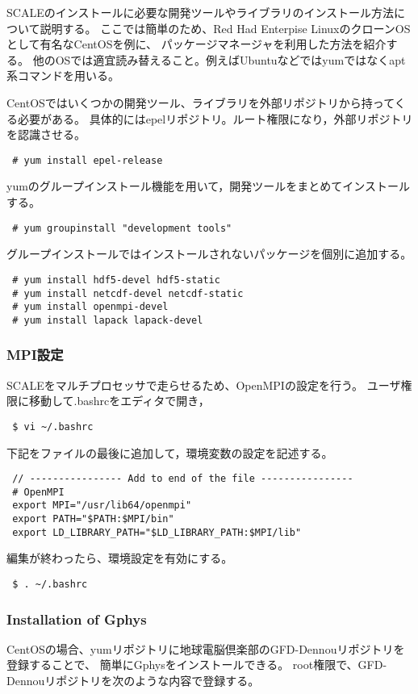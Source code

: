 SCALEのインストールに必要な開発ツールやライブラリのインストール方法について説明する。
ここでは簡単のため、Red Had Enterpise LinuxのクローンOSとして有名なCentOSを例に、
パッケージマネージャを利用した方法を紹介する。
他のOSでは適宜読み替えること。例えばUbuntuなどではyumではなくapt系コマンドを用いる。

CentOSではいくつかの開発ツール、ライブラリを外部リポジトリから持ってくる必要がある。
具体的にはepelリポジトリ。ルート権限になり，外部リポジトリを認識させる。
\begin{verbatim}
 # yum install epel-release
\end{verbatim}
yumのグループインストール機能を用いて，開発ツールをまとめてインストールする。
\begin{verbatim}
 # yum groupinstall "development tools"
\end{verbatim}
グループインストールではインストールされないパッケージを個別に追加する。
\begin{verbatim}
 # yum install hdf5-devel hdf5-static
 # yum install netcdf-devel netcdf-static
 # yum install openmpi-devel
 # yum install lapack lapack-devel
\end{verbatim}


\subsubsection{MPI設定}

SCALEをマルチプロセッサで走らせるため、OpenMPIの設定を行う。
ユーザ権限に移動して.bashrcをエディタで開き，
\begin{verbatim}
 $ vi ~/.bashrc
\end{verbatim}
下記をファイルの最後に追加して，環境変数の設定を記述する。
\begin{verbatim}
 // ---------------- Add to end of the file ----------------
 # OpenMPI
 export MPI="/usr/lib64/openmpi"
 export PATH="$PATH:$MPI/bin"
 export LD_LIBRARY_PATH="$LD_LIBRARY_PATH:$MPI/lib"
\end{verbatim}
編集が終わったら、環境設定を有効にする。
\begin{verbatim}
 $ . ~/.bashrc
\end{verbatim}


\subsubsection{Installation of Gphys}

CentOSの場合、yumリポジトリに地球電脳倶楽部のGFD-Dennouリポジトリを登録することで、
簡単にGphysをインストールできる。
root権限で、GFD-Dennouリポジトリを次のような内容で登録する。

